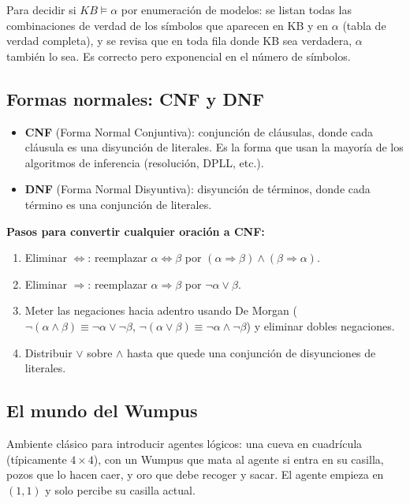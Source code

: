 \begin{example}
    Para decidir si $KB \models \alpha$ por enumeración de modelos: se listan todas las combinaciones de verdad de los
    símbolos que aparecen en KB y en $\alpha$ (tabla de verdad completa), y se revisa que en toda fila donde KB sea
    verdadera, $\alpha$ también lo sea. Es correcto pero exponencial en el número de símbolos.
\end{example}

\subsection{Formas normales: CNF y DNF}

\begin{itemize}
    \item \textbf{CNF} (Forma Normal Conjuntiva): conjunción de cláusulas, donde cada cláusula es una disyunción de
    literales. Es la forma que usan la mayoría de los algoritmos de inferencia (resolución, DPLL, etc.).
    \item \textbf{DNF} (Forma Normal Disyuntiva): disyunción de términos, donde cada término es una conjunción de
    literales.
\end{itemize}

\textbf{Pasos para convertir cualquier oración a CNF:}
\begin{enumerate}
    \item Eliminar $\Leftrightarrow$: reemplazar $\alpha \Leftrightarrow \beta$ por $(\alpha \Rightarrow \beta) \land (\beta \Rightarrow \alpha)$.
    \item Eliminar $\Rightarrow$: reemplazar $\alpha \Rightarrow \beta$ por $\neg\alpha \lor \beta$.
    \item Meter las negaciones hacia adentro usando De Morgan ($\neg(\alpha \land \beta) \equiv \neg\alpha \lor \neg\beta$,
    $\neg(\alpha \lor \beta) \equiv \neg\alpha \land \neg\beta$) y eliminar dobles negaciones.
    \item Distribuir $\lor$ sobre $\land$ hasta que quede una conjunción de disyunciones de literales.
\end{enumerate}

\subsection{El mundo del Wumpus}

Ambiente clásico para introducir agentes lógicos: una cueva en cuadrícula (típicamente $4\times4$), con un Wumpus que
mata al agente si entra en su casilla, pozos que lo hacen caer, y oro que debe recoger y sacar. El agente empieza en
$(1,1)$ y solo percibe su casilla actual.


